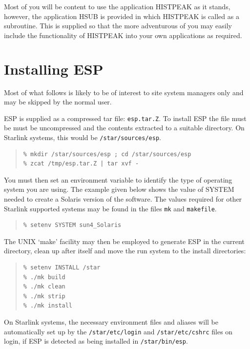 \documentclass[twoside,11pt]{article}
\newenvironment{myquote}{\begin{quote}\begin{small}}{\end{small}\end{quote}}
\begin{document}
Most of you will be content to use the application HISTPEAK as it stands,
however, the application HSUB is provided in which HISTPEAK is called as
a subroutine. This is supplied so that the more adventurous of you may
easily include the functionality of HISTPEAK into your own
applications as required.


\section{Installing ESP}
\label{sec:installing}

Most of what follows is likely to be of interest to site system managers only
and may be skipped by the normal user.

ESP is supplied as a compressed tar file: {\tt esp.tar.Z}. To install ESP
the file must be must be uncompressed and the contents extracted to a
suitable directory.  On Starlink systems, this would be {\tt /star/sources/esp}.

\begin{myquote}
\begin{verbatim}
% mkdir /star/sources/esp ; cd /star/sources/esp
% zcat /tmp/esp.tar.Z | tar xvf -
\end{verbatim}
\end{myquote}

You must then set an environment variable to identify the type of
operating system you are using. The example given below shows the value
of SYSTEM needed to create a Solaris version of the software. The values
required for other Starlink supported systems may be found in the files
{\tt mk} and {\tt makefile}.

\begin{myquote}
\begin{verbatim}
% setenv SYSTEM sun4_Solaris
\end{verbatim}
\end{myquote}

The UNIX `make' facility may then be employed to generate ESP in the
current directory, clean up after itself and move the run system to the
install directories:

\begin{myquote}
\begin{verbatim}
% setenv INSTALL /star
% ./mk build
% ./mk clean
% ./mk strip
% ./mk install
\end{verbatim}
\end{myquote}

On Starlink systems, the necessary environment files and aliases will
be automatically set up by the {\tt /star/etc/login} and {\tt /star/etc/cshrc}
files on login, if ESP is detected as being installed in {\tt /star/bin/esp}.
\end{document}

